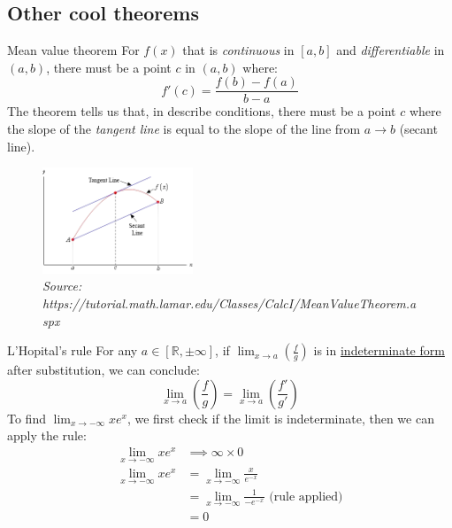 \documentclass{article}
\begin{document}
\subsection{Other cool theorems}
\begin{theorem}
    {Mean value theorem}
    For $f(x)$ that is \emph{continuous} in $[a,b]$ and \emph{differentiable} in $(a,b)$, there must be a point $c$ in $(a,b)$ where:
    \[f'(c)=\frac{f(b)-f(a)}{b-a}\]
    The theorem tells us that, in describe conditions, there must be a point $c$ where the slope of the \emph{tangent line} is equal to the slope of the line from $a\to b$ (secant line).
    \begin{figure}[H]
        \centering
        \includegraphics[width=0.4\textwidth]{./img/mvt.png}
        \caption*{\tiny\textit{\color{gray}Source: https://tutorial.math.lamar.edu/Classes/CalcI/MeanValueTheorem.aspx}}
    \end{figure}
\end{theorem}
\begin{theorem}
    {L'Hopital's rule}
    For any $a\in [\mathds{R}, \pm\infty]$, if $\lim_{x\to a}(\frac{f}{g})$ is in \hyperref[sec:indeterminate]{indeterminate form} after substitution, we can conclude:
    \[\lim_{x\to a}(\frac{f}{g})=\lim_{x\to a}(\frac{f'}{g'})\]
    \tcblower
    To find $\lim_{x\to-\infty}xe^x$, we first check if the limit is indeterminate, then we can apply the rule:
    \begin{align*}
        \lim_{x\to-\infty}xe^x & \implies \infty\times0                                      \\
        \lim_{x\to-\infty}xe^x & = \lim_{x\to-\infty}\frac{x}{e^{-x}}                        \\
                               & = \lim_{x\to-\infty}\frac{1}{-e^{-x}}\text{ (rule applied)} \\
                               & = 0
    \end{align*}
\end{theorem}
\end{document}
